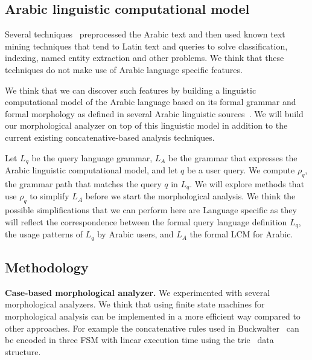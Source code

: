 \documentclass[12pt]{article}
\begin{document}
{\subsection{Arabic linguistic computational model }
\label{s:design:lcm}

Several techniques~\cite{AEL07,Ham07,Abd07,MEl03} 
preprocessed the Arabic text and then used known text 
mining techniques that tend to Latin text and queries
to solve classification, indexing, named entity 
extraction and other problems.
We think that these techniques do not make use 
of Arabic language specific features.

We think that we can discover such features by building
a linguistic computational model of the Arabic language
based on its formal grammar and formal morphology
as defined in several Arabic linguistic 
sources~\cite{Sha73,Abd00,Abd001}.
We will build our morphological analyzer on top 
of this linguistic model in addition to the current existing
concatenative-based analysis techniques. 

Let $L_q$ be the query language grammar, 
$L_A$ be the grammar that expresses the Arabic linguistic
computational model, and let $q$ be a user query.
We compute $\rho_q$, the grammar path that matches 
the query $q$ in $L_q$. 
We will explore methods that use $\rho_q$ to simplify 
$L_A$ before we start the morphological analysis. 
We think the possible simplifications that we can perform
here are Language specific as they will reflect the 
correspondence between the formal query language definition $L_q$, 
the usage patterns of $L_q$  by Arabic users, 
and $L_A$ the formal LCM for Arabic. 


\subsection{Methodology}
\label{s:design:method}

\begin{figure}
\end{figure}

{\bf Case-based morphological analyzer.}
We experimented with several morphological analyzers.
We think that using finite state machines for morphological analysis
can be implemented in a more efficient way compared to other 
approaches. 
For example the concatenative rules used in Buckwalter~\cite{Tim04}
can be encoded in three FSM with linear execution time using 
the trie~\cite{Aoe:89} data structure. 

}
\end{document}
